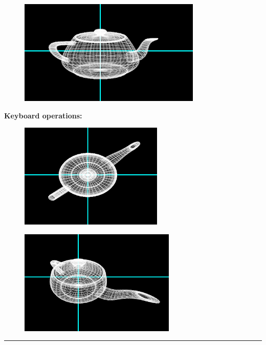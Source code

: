 \documentclass[9pt,letterpaper]{article}
\begin{document}
\begin{figure}[h]
    \centering
    \includegraphics[height=5cm]{Outputs/OP4.png}
\end{figure}
\newpage
\textbf{Keyboard operations: }
\begin{figure}[h]
    \centering
    \includegraphics[height=5cm]{Outputs/OP5.png}
\end{figure}
\begin{figure}[h]
    \centering
    \includegraphics[height=5cm]{Outputs/OP6.png}
\end{figure}

\bigskip\bigskip
\hrule
\end{document}
